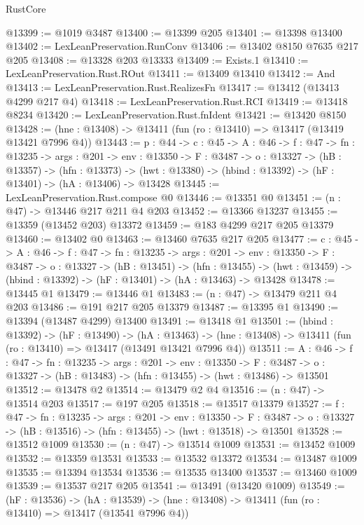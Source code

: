 \begin{lexlean}{RustCore}
\begin{coremodule}
@13399 := @1019 @3487
@13400 := @13399 @205
@13401 := @13398 @13400
@13402 := LexLeanPreservation.RunConv
@13406 := @13402 @8150 @7635 @217 @205
@13408 := @13328 @203 @13333
@13409 := Exists.{1}
@13410 := LexLeanPreservation.Rust.ROut
@13411 := @13409 @13410
@13412 := And
@13413 := LexLeanPreservation.Rust.RealizesFn
@13417 := @13412 (@13413 @4299 @217 @4)
@13418 := LexLeanPreservation.Rust.RCI
@13419 := @13418 @8234
@13420 := LexLeanPreservation.Rust.fnIdent
@13421 := @13420 @8150
@13428 := (hne : @13408) -> @13411 (fun (ro : @13410) => @13417 (@13419 @13421 @7996 @4))
@13443 := {p : @44} ->
  {c : @45} ->
  {A : @46} ->
  {f : @47} ->
  {fn : @13235} ->
  {args : @201} ->
  {env : @13350} ->
  {F : @3487} ->
  {o : @13327} ->
  (hB : @13357) ->
  (hfn : @13373) -> (hwt : @13380) -> (hbind : @13392) -> (hF : @13401) -> (hA : @13406) -> @13428
@13445 := LexLeanPreservation.Rust.compose @0
@13446 := @13351 @0
@13451 := (n : @47) -> @13446 @217 @211 @4 @203
@13452 := @13366 @13237
@13455 := @13359 (@13452 @203) @13372
@13459 := @183 @4299 @217 @205 @13379
@13460 := @13402 @0
@13463 := @13460 @7635 @217 @205
@13477 := {c : @45} ->
  {A : @46} ->
  {f : @47} ->
  {fn : @13235} ->
  {args : @201} ->
  {env : @13350} ->
  {F : @3487} ->
  {o : @13327} ->
  (hB : @13451) ->
  (hfn : @13455) -> (hwt : @13459) -> (hbind : @13392) -> (hF : @13401) -> (hA : @13463) -> @13428
@13478 := @13445 @1
@13479 := @13446 @1
@13483 := (n : @47) -> @13479 @211 @4 @203
@13486 := @191 @217 @205 @13379
@13487 := @13395 @1
@13490 := @13394 (@13487 @4299) @13400
@13491 := @13418 @1
@13501 := (hbind : @13392) ->
  (hF : @13490) ->
  (hA : @13463) -> (hne : @13408) -> @13411 (fun (ro : @13410) => @13417 (@13491 @13421 @7996 @4))
@13511 := {A : @46} ->
  {f : @47} ->
  {fn : @13235} ->
  {args : @201} ->
  {env : @13350} ->
  {F : @3487} -> {o : @13327} -> (hB : @13483) -> (hfn : @13455) -> (hwt : @13486) -> @13501
@13512 := @13478 @2
@13514 := @13479 @2 @4
@13516 := (n : @47) -> @13514 @203
@13517 := @197 @205
@13518 := @13517 @13379
@13527 := {f : @47} ->
  {fn : @13235} ->
  {args : @201} ->
  {env : @13350} ->
  {F : @3487} -> {o : @13327} -> (hB : @13516) -> (hfn : @13455) -> (hwt : @13518) -> @13501
@13528 := @13512 @1009
@13530 := (n : @47) -> @13514 @1009
@13531 := @13452 @1009
@13532 := @13359 @13531
@13533 := @13532 @13372
@13534 := @13487 @1009
@13535 := @13394 @13534
@13536 := @13535 @13400
@13537 := @13460 @1009
@13539 := @13537 @217 @205
@13541 := @13491 (@13420 @1009)
@13549 := (hF : @13536) ->
  (hA : @13539) -> (hne : @13408) -> @13411 (fun (ro : @13410) => @13417 (@13541 @7996 @4))

\end{coremodule}
\end{lexlean}
